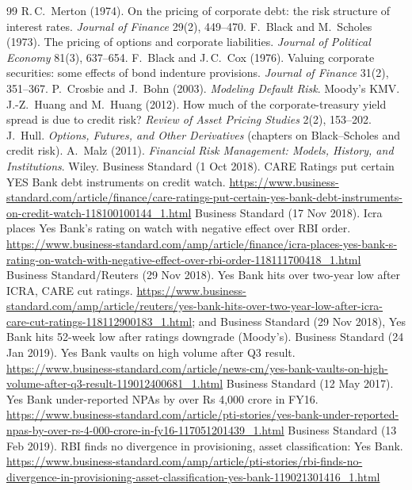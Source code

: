 \begin{thebibliography}{99}\small
{} R.\,C.\ Merton (1974). On the pricing of corporate debt: the risk structure of interest rates. \emph{Journal of Finance} 29(2), 449--470.
 F.\ Black and M.\ Scholes (1973). The pricing of options and corporate liabilities. \emph{Journal of Political Economy} 81(3), 637--654.
 F.\ Black and J.\,C.\ Cox (1976). Valuing corporate securities: some effects of bond indenture provisions. \emph{Journal of Finance} 31(2), 351--367.
 P.\ Crosbie and J.\ Bohn (2003). \emph{Modeling Default Risk}. Moody's KMV.
 J.-Z.\ Huang and M.\ Huang (2012). How much of the corporate-treasury yield spread is due to credit risk? \emph{Review of Asset Pricing Studies} 2(2), 153--202.
 J.\ Hull. \emph{Options, Futures, and Other Derivatives} (chapters on Black--Scholes and credit risk).
 A.\ Malz (2011). \emph{Financial Risk Management: Models, History, and Institutions}. Wiley.
 Business Standard (1 Oct 2018). CARE Ratings put certain YES Bank debt instruments on credit watch. \url{https://www.business-standard.com/article/finance/care-ratings-put-certain-yes-bank-debt-instruments-on-credit-watch-118100100144_1.html}
 Business Standard (17 Nov 2018). Icra places Yes Bank's rating on watch with negative effect over RBI order. \url{https://www.business-standard.com/amp/article/finance/icra-places-yes-bank-s-rating-on-watch-with-negative-effect-over-rbi-order-118111700418_1.html}
 Business Standard/Reuters (29 Nov 2018). Yes Bank hits over two-year low after ICRA, CARE cut ratings. \url{https://www.business-standard.com/amp/article/reuters/yes-bank-hits-over-two-year-low-after-icra-care-cut-ratings-118112900183_1.html}; and Business Standard (29 Nov 2018), Yes Bank hits 52-week low after ratings downgrade (Moody's).
 Business Standard (24 Jan 2019). Yes Bank vaults on high volume after Q3 result. \url{https://www.business-standard.com/article/news-cm/yes-bank-vaults-on-high-volume-after-q3-result-119012400681_1.html}
 Business Standard (12 May 2017). Yes Bank under-reported NPAs by over Rs 4,000 crore in FY16. \url{https://www.business-standard.com/article/pti-stories/yes-bank-under-reported-npas-by-over-rs-4-000-crore-in-fy16-117051201439_1.html}
 Business Standard (13 Feb 2019). RBI finds no divergence in provisioning, asset classification: Yes Bank. \url{https://www.business-standard.com/amp/article/pti-stories/rbi-finds-no-divergence-in-provisioning-asset-classification-yes-bank-119021301416_1.html}

\end{thebibliography}
